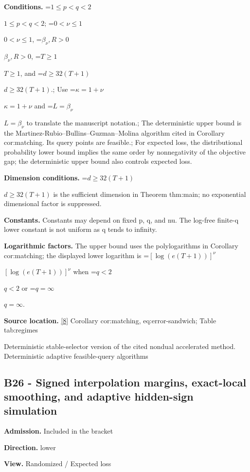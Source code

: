 \documentclass[10pt,a4paper]{article}
\newcommand{\AtlasMath}[1]{\par\begingroup\centering\setbox0=\hbox{$\displaystyle #1$}\ifdim\wd0>1.4\linewidth\typeout{ATLAS WIDE FORMULA: \the\wd0}\fi\ifdim\wd0>\linewidth\resizebox{\linewidth}{!}{\box0}\else\box0\fi\par\endgroup}
\newcommand{\AtlasInlineMath}[1]{\begingroup\setbox0=\hbox{$#1$}\ifdim\wd0>.4\linewidth\endgroup\AtlasMath{#1}\else\endgroup$#1$\fi}
\begin{document}
\textbf{Conditions.} \AtlasInlineMath{1\le p<q<2}; \AtlasInlineMath{0<\nu\le1}, \AtlasInlineMath{\beta_\nu,R>0}, \AtlasInlineMath{T\ge1}, and \AtlasInlineMath{d\ge32(T+1)}.; Use \AtlasInlineMath{\kappa=1+\nu} and \AtlasInlineMath{L=\beta_\nu} to translate the manuscript notation.; The deterministic upper bound is the Martinez-Rubio--Bullins--Guzman--Molina algorithm cited in Corollary cor:matching. Its query points are feasible.; For expected loss, the distributional probability lower bound implies the same order by nonnegativity of the objective gap; the deterministic upper bound also controls expected loss.



\textbf{Dimension conditions.} \AtlasInlineMath{d\ge32(T+1)} is the sufficient dimension in Theorem thm:main; no exponential dimensional factor is suppressed.



\textbf{Constants.} Constants may depend on fixed p, q, and nu. The log-free finite-q lower constant is not uniform as q tends to infinity.



\textbf{Logarithmic factors.} The upper bound uses the polylogarithms in Corollary cor:matching; the displayed lower logarithm is \AtlasInlineMath{[\log(e(T+1))]^\nu} when \AtlasInlineMath{q<2} or \AtlasInlineMath{q=\infty}.



\textbf{Source location.} \href{https://github.com/WU-Wendao/Colombo/blob/main/colombo_sensorium/Complexity_altas/data/sources/colombo/B1/manuscript.pdf}{[8]} Corollary cor:matching, eq:error-sandwich; Table tab:regimes



Deterministic stable-selector version of the cited nondual accelerated method. Deterministic adaptive feasible-query algorithms



\subsection{B26 - Signed interpolation margins, exact-local smoothing, and adaptive hidden-sign simulation}


\textbf{Admission.} Included in the bracket



\textbf{Direction.} lower



\textbf{View.} Randomized / Expected loss
\end{document}
